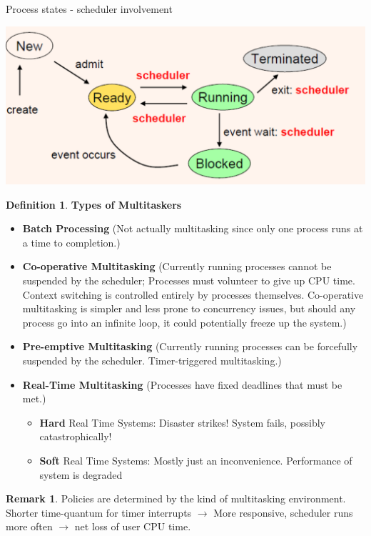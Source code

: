 \documentclass[11pt,a4paper]{article}
\theoremstyle{definition}
\newtheorem*{remark}{Remark}
\newtheorem{definition}{Definition}[section]
\newenvironment{myitemize}
{ \begin{itemize}
    \setlength{\itemsep}{5pt}
    \setlength{\parskip}{0pt}
    \setlength{\parsep}{0pt}     }
{ \end{itemize}                  }
\begin{document}
\begin{tcolorbox}
	\textsf{Process states - scheduler involvement}
	
	\includegraphics[scale=0.4]{m1/processSchedulerStates}
	\centering
\end{tcolorbox}

\begin{definition}{\textbf{Types of Multitaskers}}
	\begin{myitemize}
		\item \textbf{Batch Processing} (Not actually multitasking since only one process runs at a time to completion.)
		\item \textbf{Co-operative Multitasking} (Currently running processes cannot be suspended by the scheduler; Processes must volunteer to give up CPU time. Context switching is controlled entirely by processes themselves. Co-operative multitasking is simpler and less prone to concurrency issues, but should any process go into an infinite loop, it could potentially freeze up the system.)
		\item \textbf{Pre-emptive Multitasking} (Currently running processes can be forcefully suspended by the scheduler. \textsf{Timer-triggered} multitasking.)
		\item \textbf{Real-Time Multitasking} (Processes have fixed deadlines that must be met.)
		\begin{myitemize}
			\item \textbf{Hard} Real Time Systems: Disaster strikes! System fails, possibly catastrophically!
			\item \textbf{Soft} Real Time Systems: Mostly just an inconvenience. Performance of system is degraded
		\end{myitemize}
	\end{myitemize}
\end{definition}
\begin{remark}
	Policies are determined by the kind of multitasking environment. Shorter time-quantum for timer interrupts $\rightarrow$ More responsive, scheduler runs more often $\rightarrow$ net loss of user CPU time.
\end{remark}
\end{document}
